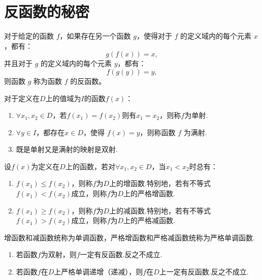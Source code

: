 \section{反函数的秘密}

\begin{definition}[反函数的定义]
	对于给定的函数 $f$，如果存在另一个函数 $g$，使得对于 $f$ 的定义域内的每个元素 $x$，都有：
	\begin{equation}
		g(f(x)) = x,
	\end{equation} 
	并且对于 $g$ 的定义域内的每个元素 $y$，都有：
	\begin{equation}
		f(g(y)) = y,
	\end{equation}
	则函数 $g$ 称为函数 $f$ 的反函数。
\end{definition}

\begin{definition}[单射、满射与双射]
	对于定义在$D$上的值域为$I$的函数$f(x)$：
	\begin{enumerate}
		\item $\forall x_1,x_2\in D$，若$f(x_1)=f(x_2)$则有$x_1=x_2$，则称$f$为单射.
		\item $\forall y\in I$，都存在$x\in D$，使得 $f(x) = y$，则称函数 $f$ 为满射.
		\item 既是单射又是满射的映射是双射.
	\end{enumerate}
	
\end{definition}

\begin{definition}[单调函数的定义]
	设$f(x)$为定义在$D$上的函数，若对$\forall x_1,x_2\in D$，当$x_1<x_2$时总有：
	\begin{enumerate}
		\item $f(x_1)\leq f(x_2)$，则称$f$为$D$上的增函数.特别地，若有不等式$f(x_1)< f(x_2)$成立，则称$f$为$D$上的严格增函数.
		\item $f(x_1)\geq f(x_2)$，则称$f$为$D$上的减函数.特别地，若有不等式$f(x_1)> f(x_2)$成立，则称$f$为$D$上的严格减函数.
	\end{enumerate}
	增函数和减函数统称为单调函数，严格增函数和严格减函数统称为严格单调函数.
\end{definition}

\begin{proposition}
	\begin{enumerate}
		\item 若函数$f$为双射，则$f$一定有反函数.反之不成立.
		\item 若函数$f$在$D$上严格单调递增（递减），则$f$在$D$上一定有反函数.反之不成立.
	\end{enumerate}
\end{proposition}
